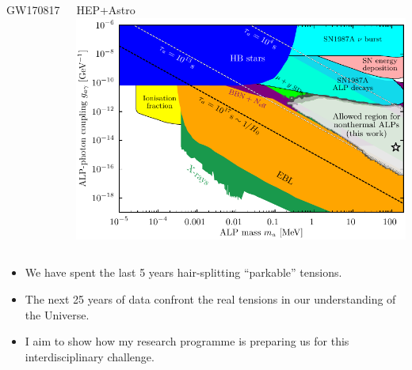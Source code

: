 \documentclass[aspectratio=169]{beamer}
\begin{document}
\begin{frame}
\begin{columns}
\begin{block}{GW170817}
        \end{block}
        \begin{block}{HEP+Astro}
            \includegraphics[width=\textwidth]{figures/cosmoalp.pdf}

            \hfill{}
        \end{block}
    \end{columns}

    \begin{itemize}
        \item We have spent the last 5 years hair-splitting ``parkable'' tensions.
        \item The next 25 years of data confront the real tensions in our understanding of the Universe.
        \item I aim to show how my research programme is preparing us for this interdisciplinary challenge.
    \end{itemize}

\end{frame}
\end{document}
